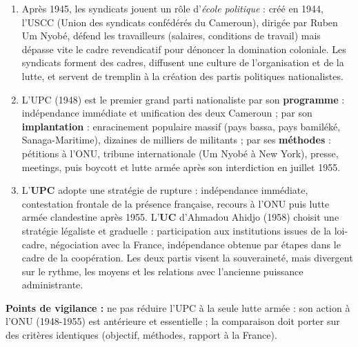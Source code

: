 \documentclass[11pt]{article}
\newcommand{\cle}[1]{{\popxbold\color{popdark}#1}}
\begin{document}
\begin{corrige}
\begin{enumerate}
\item Après 1945, les syndicats jouent un rôle d'\emph{école politique} : créé en 1944, l'\cle{USCC} (Union des syndicats confédérés du Cameroun), dirigée par Ruben Um Nyobé, défend les travailleurs (salaires, conditions de travail) mais dépasse vite le cadre revendicatif pour dénoncer la domination coloniale. Les syndicats forment des cadres, diffusent une culture de l'organisation et de la lutte, et servent de tremplin à la création des partis politiques nationalistes.
\item L'\cle{UPC} (1948) est le premier grand parti nationaliste par son \textbf{programme} : indépendance immédiate et unification des deux Cameroun ; par son \textbf{implantation} : enracinement populaire massif (pays bassa, pays bamiléké, Sanaga-Maritime), dizaines de milliers de militants ; par ses \textbf{méthodes} : pétitions à l'ONU, tribune internationale (Um Nyobé à New York), presse, meetings, puis boycott et lutte armée après son interdiction en juillet 1955.
\item L'\textbf{UPC} adopte une stratégie de rupture : indépendance immédiate, contestation frontale de la présence française, recours à l'ONU puis lutte armée clandestine après 1955. L'\textbf{UC} d'Ahmadou Ahidjo (1958) choisit une stratégie légaliste et graduelle : participation aux institutions issues de la loi-cadre, négociation avec la France, indépendance obtenue par étapes dans le cadre de la coopération. Les deux partis visent la souveraineté, mais divergent sur le rythme, les moyens et les relations avec l'ancienne puissance administrante.
\end{enumerate}
\textbf{Points de vigilance :} ne pas réduire l'UPC à la seule lutte armée : son action à l'ONU (1948-1955) est antérieure et essentielle ; la comparaison doit porter sur des critères identiques (objectif, méthodes, rapport à la France).
\end{corrige}
\end{document}
